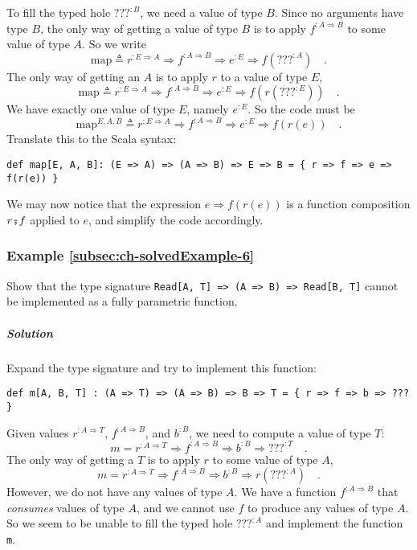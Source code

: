 To fill the typed hole $\text{???}^{:B}$, we need a value of type
$B$. Since no arguments have type $B$, the only way of getting a
value of type $B$ is to apply $f^{:A\Rightarrow B}$ to some value
of type $A$. So we write
\[
\text{map}\triangleq r^{:E\Rightarrow A}\Rightarrow f^{:A\Rightarrow B}\Rightarrow e^{:E}\Rightarrow f(???^{:A})\quad.
\]
The only way of getting an $A$ is to apply $r$ to a value of type
$E$,
\[
\text{map}\triangleq r^{:E\Rightarrow A}\Rightarrow f^{:A\Rightarrow B}\Rightarrow e^{:E}\Rightarrow f(r(???^{:E}))\quad.
\]
We have exactly one value of type $E$, namely $e^{:E}$. So the code
must be 
\[
\text{map}^{E,A,B}\triangleq r^{:E\Rightarrow A}\Rightarrow f^{:A\Rightarrow B}\Rightarrow e^{:E}\Rightarrow f(r(e))\quad.
\]
Translate this to the Scala syntax:
\begin{lstlisting}
def map[E, A, B]: (E => A) => (A => B) => E => B = { r => f => e => f(r(e)) }
\end{lstlisting}
We may now notice that the expression $e\Rightarrow f(r(e))$ is a
function composition $r\bef f$ applied to $e$, and simplify the
code accordingly.

\subsubsection{Example \label{subsec:ch-solvedExample-6}\ref{subsec:ch-solvedExample-6}}

Show that the type signature \lstinline!Read[A, T] => (A => B) => Read[B, T]!
cannot be implemented as a fully parametric function.

\subparagraph{Solution}

Expand the type signature and try to implement this function:
\begin{lstlisting}
def m[A, B, T] : (A => T) => (A => B) => B => T = { r => f => b => ??? }
\end{lstlisting}
Given values $r^{:A\Rightarrow T}$, $f^{:A\Rightarrow B}$, and $b^{:B}$,
we need to compute a value of type $T$:
\[
m=r^{:A\Rightarrow T}\Rightarrow f^{:A\Rightarrow B}\Rightarrow b^{:B}\Rightarrow???^{:T}\quad.
\]
The only way of getting a $T$ is to apply $r$ to some value of type
$A$,
\[
m=r^{:A\Rightarrow T}\Rightarrow f^{:A\Rightarrow B}\Rightarrow b^{:B}\Rightarrow r(???^{:A})\quad.
\]
However, we do not have any values of type $A$. We have a function
$f^{:A\Rightarrow B}$ that \emph{consumes} values of type $A$, and
we cannot use $f$ to produce any values of type $A$. So we seem
to be unable to fill the typed hole $\text{???}^{:A}$ and implement
the function \lstinline!m!.

